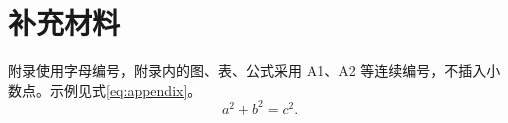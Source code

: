 \chapter{补充材料}
附录使用字母编号，附录内的图、表、公式采用 A1、A2 等连续编号，不插入小数点。示例见式\eqref{eq:appendix}。
\begin{equation}
  a^2+b^2=c^2.\label{eq:appendix}
\end{equation}
